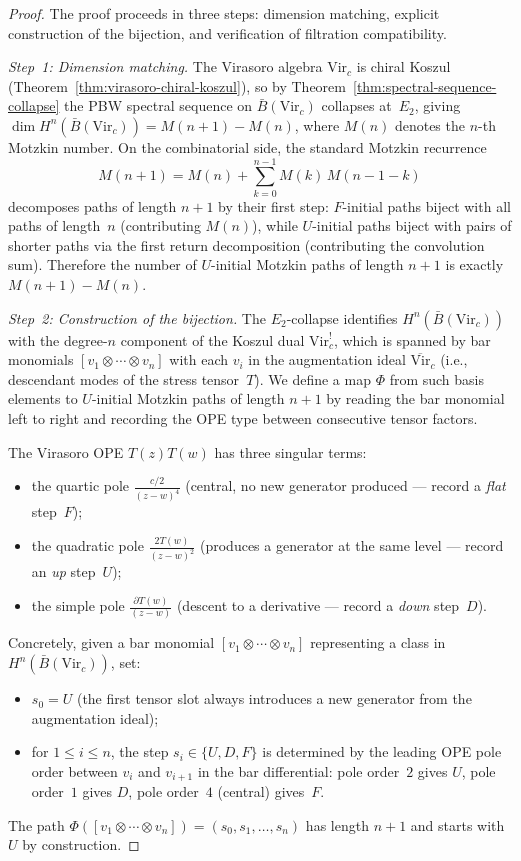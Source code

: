 \begin{proof}
The proof proceeds in three steps: dimension matching,
explicit construction of the bijection, and verification
of filtration compatibility.

\medskip
\noindent\emph{Step~1: Dimension matching.}
The Virasoro algebra $\mathrm{Vir}_c$ is chiral Koszul
(Theorem~\ref{thm:virasoro-chiral-koszul}), so
by Theorem~\ref{thm:spectral-sequence-collapse} the
PBW spectral sequence on $\bar{B}(\mathrm{Vir}_c)$
collapses at~$E_2$, giving
$\dim H^n(\bar{B}(\mathrm{Vir}_c)) = M(n{+}1) - M(n)$,
where $M(n)$ denotes the $n$-th Motzkin number.
On the combinatorial side, the standard Motzkin recurrence
\[
M(n{+}1) = M(n) + \sum_{k=0}^{n-1} M(k)\,M(n{-}1{-}k)
\]
decomposes paths of length $n{+}1$ by their first step:
$F$-initial paths biject with all paths of length~$n$
(contributing $M(n)$), while $U$-initial paths biject with
pairs of shorter paths via the first return decomposition
(contributing the convolution sum).  Therefore the number
of $U$-initial Motzkin paths of length $n{+}1$ is exactly
$M(n{+}1) - M(n)$.

\medskip
\noindent\emph{Step~2: Construction of the bijection.}
The $E_2$-collapse identifies $H^n(\bar{B}(\mathrm{Vir}_c))$
with the degree-$n$ component of the Koszul dual
$\mathrm{Vir}_c^!$, which is spanned by bar monomials
$[v_1 \otimes \cdots \otimes v_n]$ with each $v_i$ in
the augmentation ideal $\overline{\mathrm{Vir}}_c$
(i.e., descendant modes of the stress tensor~$T$).
We define a map $\Phi$ from such basis elements to
$U$-initial Motzkin paths of length $n{+}1$ by reading
the bar monomial left to right and recording the OPE
type between consecutive tensor factors.

The Virasoro OPE $T(z)T(w)$ has three singular terms:
\begin{itemize}
\item the quartic pole $\frac{c/2}{(z-w)^4}$ (central,
  no new generator produced --- record a \emph{flat} step~$F$);
\item the quadratic pole $\frac{2T(w)}{(z-w)^2}$ (produces
  a generator at the same level --- record an \emph{up} step~$U$);
\item the simple pole $\frac{\partial T(w)}{(z-w)}$
  (descent to a derivative --- record a \emph{down} step~$D$).
\end{itemize}
Concretely, given a bar monomial
$[v_1 \otimes \cdots \otimes v_n]$ representing a class
in $H^n(\bar{B}(\mathrm{Vir}_c))$, set:
\begin{itemize}
\item $s_0 = U$ (the first tensor slot always introduces
  a new generator from the augmentation ideal);
\item for $1 \leq i \leq n$, the step $s_i \in \{U,D,F\}$
  is determined by the leading OPE pole order
  between $v_i$ and $v_{i+1}$ in the bar differential:
  pole order~$2$ gives $U$, pole order~$1$ gives $D$,
  pole order~$4$ (central) gives~$F$.
\end{itemize}
The path $\Phi([v_1 \otimes \cdots \otimes v_n])
= (s_0, s_1, \ldots, s_n)$ has length $n{+}1$ and
starts with~$U$ by construction.


\end{proof}
